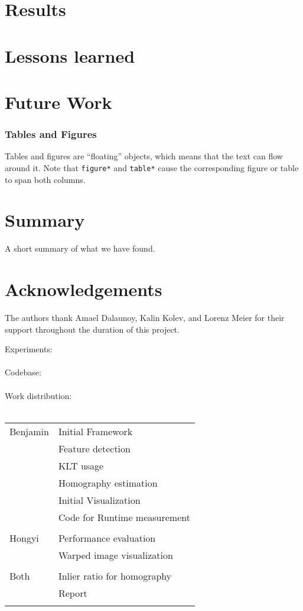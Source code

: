 \documentclass[10pt,conference,compsocconf]{IEEEtran}
\begin{document}
\section{Results}

\section{Lessons learned}

\section{Future Work}

\subsubsection{Tables and Figures}

Tables and figures are ``floating'' objects, which means that the text
can flow around it.
Note
that \texttt{figure*} and \texttt{table*} cause the corresponding
figure or table to span both columns.



\section{Summary}

A short summary of what we have found.

\section*{Acknowledgements}
The authors thank Amael Dalaunoy, Kalin Kolev, and Lorenz Meier for their support throughout the duration of this project. 




\newpage
\appendix
Experiments:\\\\

\appendix
Codebase:\\\\

\appendix
Work distribution:\\\\
\begin{tabular}{l l}
Benjamin & Initial Framework \\
& Feature detection \\
& KLT usage \\
& Homography estimation \\
& Initial Visualization \\
& Code for Runtime measurement\\
\\
Hongyi & Performance evaluation \\
& Warped image visualization\\
\\
Both & Inlier ratio for homography \\
& Report\\
\\
\end{tabular} 
\end{document}
